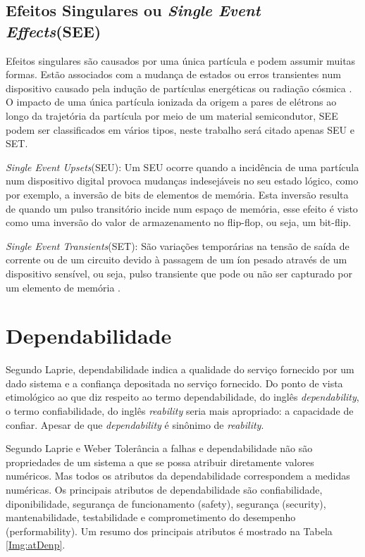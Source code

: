 \subsection{Efeitos Singulares ou \textit{Single Event Effects}(SEE)} \label{subsec:EfeitosSingulares}

Efeitos singulares são causados por uma única partícula e podem assumir muitas formas. Estão associados com a mudança de estados ou erros transientes num dispositivo causado pela indução de partículas energéticas ou radiação cósmica \cite{Yu:2008}. O impacto de uma única partícula ionizada da origem a pares de elétrons ao longo da trajetória da partícula por meio de um material semicondutor, SEE podem ser classificados em vários tipos, neste trabalho será citado apenas SEU e SET.

\textit{Single Event Upsets}(SEU): Um SEU ocorre quando a incidência de uma partícula num dispositivo digital provoca mudanças indesejáveis no seu estado lógico, como por exemplo, a inversão de bits de elementos de memória. Esta inversão resulta de quando um pulso transitório incide num espaço de memória, esse efeito é visto como uma inversão do valor de armazenamento no flip-flop, ou seja, um bit-flip.

\textit{Single Event Transients}(SET): São variações temporárias na tensão de saída de corrente ou de um circuito
devido à passagem de um íon pesado através de um dispositivo sensível, ou seja, pulso transiente que pode ou não ser capturado por um elemento de memória \cite{Ecoffet:1994}.



\section{Dependabilidade} \label{sec:denpendabilidade}

Segundo Laprie, dependabilidade indica a qualidade do serviço fornecido por um dado sistema e a confiança depositada no serviço fornecido. Do ponto de vista etimológico ao que diz respeito ao termo dependabilidade, do inglês \textit{dependability}, o termo confiabilidade, do inglês \textit{reability} seria mais apropriado: a capacidade de confiar. Apesar de que \textit{dependability} é sinônimo de \textit{reability}. 

Segundo Laprie e Weber \cite{Weber:2002} Tolerância a falhas e dependabilidade não são propriedades de um sistema a que se possa atribuir diretamente valores numéricos. Mas todos os atributos da dependabilidade correspondem a medidas numéricas. Os principais atributos de dependabilidade são confiabilidade, diponibilidade, segurança de funcionamento (safety), segurança (security), mantenabilidade, testabilidade
e comprometimento do desempenho (performability). Um resumo dos principais
atributos é mostrado na Tabela \ref{Img:atDenp}.     

